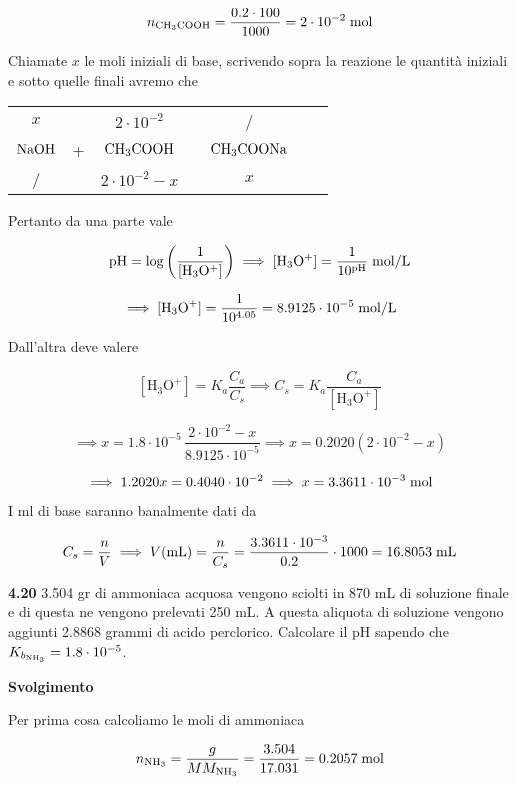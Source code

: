 $$n_{\rm CH_3COOH}=\frac{0.2 \cdot 100}{1000}=2 \cdot 10^{-2} \; \rm mol$$

Chiamate $x$ le moli iniziali di base, scrivendo sopra la reazione le quantità iniziali e sotto quelle finali avremo che

\begin{center}
    \begin{tabular}{ccccccc}
        $x$ & & $2 \cdot 10^{-2}$ & & /\\
        $\rm NaOH$ & + & $\rm CH_3COOH$ & \ce{<-->} & $\rm CH_3COONa$\\
        / & & $2 \cdot 10^{-2} - x$ & & $x$\\
    \end{tabular}
\end{center}


Pertanto da una parte vale

$$\rm pH=\log{\left(\frac{1}{[H_3O^+]}\right)}
\implies
[H_3O^+]=\frac{1}{10^{pH}} \; \rm mol/L$$

$$\implies
[\text{H}_3\text{O}^+]=\frac{1}{10^{4.05}}=8.9125 \cdot 10^{-5} \; \rm mol/L$$

Dall'altra deve valere

$$[\text{H}_3\text{O}^+]=K_a\frac{C_a}{C_s}
\implies
C_s=K_a\frac{C_a}{[\text{H}_3\text{O}^+]}$$

$$\implies
x=1.8 \cdot 10^{-5}\,\frac{2 \cdot 10^{-2} - x}{8.9125 \cdot 10^{-5}}
\implies
x=0.2020(2 \cdot 10^{-2} - x)$$

$$\implies
1.2020 x = 0.4040 \cdot 10^{-2}
\implies x=3.3611 \cdot 10^{-3} \; \rm mol$$

I ml di base saranno banalmente dati da

$$C_s=\frac{n}{V}
\implies
V(\text{mL})=\frac{n}{C_s}
=\frac{3.3611 \cdot 10^{-3}}{0.2} \cdot 1000
=16.8053 \; \rm mL$$

\vspace{0.2cm}\textbf{4.20} 3.504 gr di ammoniaca acquosa vengono sciolti in 870 mL di soluzione finale e di questa ne vengono prelevati 250 mL. A questa aliquota di soluzione vengono aggiunti 2.8868 grammi di acido perclorico. Calcolare il pH sapendo che $K_{b_{\rm NH_3}}=1.8 \cdot 10^{-5}$.

\vspace{0.2cm}\large\textbf{Svolgimento}\normalsize

\vspace{0.2cm}Per prima cosa calcoliamo le moli di ammoniaca

$$n_{\rm NH_3}
=\frac{g}{MM_{\rm NH_3}}
=\frac{3.504}{17.031}
=0.2057 \; \rm mol$$

